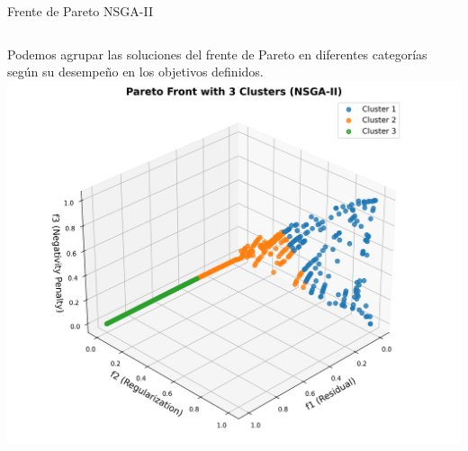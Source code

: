 \documentclass[aspectratio=169,xcolor=dvipsnames]{beamer}
\begin{document}
\begin{frame}{Frente de Pareto NSGA-II}
    \begin{columns}
        \justifying
        Podemos agrupar las soluciones del frente de Pareto en diferentes categorías según su desempeño en los objetivos definidos.
        \centering
        \includegraphics[width=\textwidth]{img/pareto_clustering_nsga2.png} \label{fig:pareto_clustering_nsga2}
    \end{columns}
\end{frame}

\end{document}
